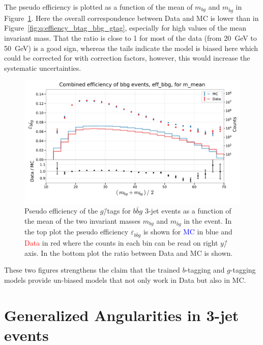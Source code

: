 The pseudo efficiency is plotted as a function of the  mean of $m_{bg}$ and $m_{\bar{b}g}$ in Figure~\ref{fig:q:effiency_btag_bbg_m_mean}. Here the overall correspondence between Data and MC is lower than in Figure~\ref{fig:q:effiency_btag_bbg_gtag}, especially for high values of the mean invariant mass. That the ratio is close to \num{1} for most of the data (from \SI{20}{\GeV} to \SI{50}{\GeV}) is a good sign, whereas the tails indicate the model is biased here which could be corrected for with correction factors, however, this would increase the systematic uncertainties. 

\begin{figure}[h!]
  \centerfloat
  \includegraphics[width=1.1\textwidth, trim=10 20 5 40, clip]{figures/quarks/eff_bbg_m_mean-down_sample=1.00-ML_vars=vertex-selection=b-ejet_min=4-n_iter_RS_lgb=99-n_iter_RS_xgb=9-cdot_cut=0.90-version=19.pdf}
  \caption[$g$\=/Tagging Pseudo Efficiency for $b\bar{b}g$\=/Events as a Function of The Mean Invariant Mass]
          {Pseudo efficiency of the $g$\=/tags for $b\bar{b}g$ 3-jet events as a function of the mean of the two invariant masses $m_{bg}$ and $m_{\bar{b}g}$ in the event. In the top plot the pseudo efficiency $\varepsilon_{b\bar{b}g}$ is shown for \textcolor{blue}{MC} in blue and \textcolor{red}{Data} in red where the counts in each bin can be read on right $y$\=/axis. In the bottom plot the ratio between Data and MC is shown.} 
  \label{fig:q:effiency_btag_bbg_m_mean}
\end{figure}

These two figures strengthens the claim that the trained $b$-tagging and $g$-tagging models provide un-biased models that not only work in Data but also in MC. 

\section{Generalized Angularities in 3-jet events}
\label{sec:q:generalized_angularities_3j}

